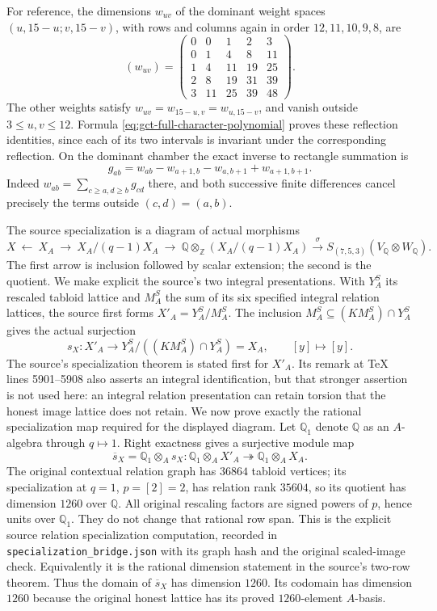 For reference, the dimensions $w_{uv}$ of the dominant weight
spaces $(u,15-u;v,15-v)$, with rows and columns again in order
$12,11,10,9,8$, are
\begin{equation}
 (w_{uv})=
 \begin{pmatrix}
 0&0&1&2&3\\0&1&4&8&11\\1&4&11&19&25\\
 2&8&19&31&39\\3&11&25&39&48
 \end{pmatrix}.
 \label{eq:gct-full-dominant-weight-matrix}
\end{equation}
The other weights satisfy $w_{uv}=w_{15-u,v}=w_{u,15-v}$,
and vanish outside $3\leq u,v\leq12$. Formula
\eqref{eq:gct-full-character-polynomial} proves these reflection
identities, since each of its two intervals is invariant under the
corresponding reflection. On the dominant chamber the exact inverse
to rectangle summation is
\[
 g_{ab}=w_{ab}-w_{a+1,b}-w_{a,b+1}+w_{a+1,b+1}.
\]
Indeed $w_{ab}=\sum_{c\geq a,d\geq b}g_{cd}$ there, and both
successive finite differences cancel precisely the terms outside
$(c,d)=(a,b)$.

The source specialization is a diagram of actual morphisms
\[
 X\ \longleftarrow\ X_A\ \longrightarrow\
 X_A/(q-1)X_A\ \longrightarrow\
 \mathbb Q\otimes_{\mathbb Z}(X_A/(q-1)X_A)
 \xrightarrow{\ \sigma\ }
 S_{(7,5,3)}(V_{\mathbb Q}\otimes W_{\mathbb Q}).
\]
The first arrow is inclusion followed by scalar extension; the second
is the quotient. We make explicit the source's two integral presentations.
With $Y_A^S$ its rescaled tabloid lattice and $M_A^S$ the sum of its
six specified integral relation lattices, the source first forms
$X'_A=Y_A^S/M_A^S$. The inclusion
$M_A^S\subseteq (K M_A^S)\cap Y_A^S$ gives the actual surjection
\[
 s_X:X'_A\longrightarrow
 Y_A^S/((K M_A^S)\cap Y_A^S)=X_A,\qquad [y]\longmapsto[y].
\]
The source's specialization theorem is stated first for $X'_A$.
Its remark at TeX lines 5901--5908 also asserts an integral
identification, but that stronger assertion is not used here:
an integral relation presentation can retain torsion that the
honest image lattice does not retain. We now prove exactly the
rational specialization map required for the displayed diagram.
Let $\mathbb Q_1$ denote $\mathbb Q$ as an $A$-algebra through
$q\mapsto1$. Right exactness gives a surjective module map
\[
 \overline s_X=\mathbb Q_1\otimes_A s_X:
 \mathbb Q_1\otimes_A X'_A\twoheadrightarrow
 \mathbb Q_1\otimes_A X_A.
\]
The original contextual relation graph has $36864$ tabloid
vertices; its specialization at $q=1$, $p=[2]=2$, has relation
rank $35604$, so its quotient has dimension $1260$ over
$\mathbb Q$. All original rescaling factors are signed powers
of $p$, hence units over $\mathbb Q_1$. They do not change
that rational row span. This is the explicit source relation
specialization computation, recorded in
\texttt{specialization\_bridge.json} with its graph hash and
the original scaled-image check. Equivalently it is the
rational dimension statement in the source's two-row theorem.
Thus the domain of $\overline s_X$ has dimension $1260$.
Its codomain has dimension $1260$ because the original honest
lattice has its proved $1260$-element $A$-basis.

